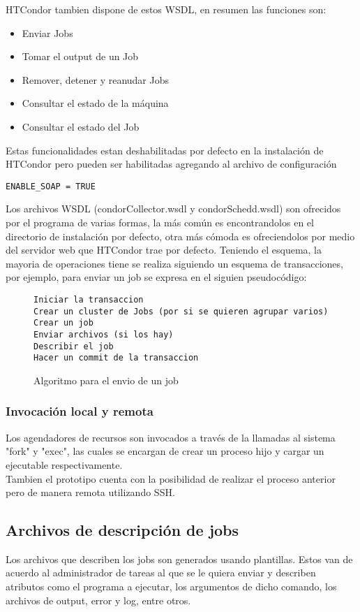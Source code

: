 HTCondor tambien dispone de estos WSDL, en resumen las funciones son: 

\begin{itemize}
\item Enviar Jobs
\item Tomar el output de un Job
\item Remover, detener y reanudar Jobs
\item Consultar el estado de la máquina
\item Consultar el estado del Job
\end{itemize}

Estas funcionalidades estan deshabilitadas por defecto en la instalación de HTCondor pero pueden ser habilitadas agregando al archivo de configuración

\begin{lstlisting}
ENABLE_SOAP = TRUE
\end{lstlisting}

Los archivos WSDL (condorCollector.wsdl y condorSchedd.wsdl) son ofrecidos por el programa de varias formas, la más común es encontrandolos en el directorio de instalación por defecto, otra más cómoda es ofreciendolos por medio del servidor web que HTCondor trae por defecto. Teniendo el esquema, la mayoria de operaciones tiene se realiza siguiendo un esquema de transacciones, por ejemplo, para enviar un job se expresa en el siguien pseudocódigo:

\begin{figure}
\begin{lstlisting}
Iniciar la transaccion
Crear un cluster de Jobs (por si se quieren agrupar varios)
Crear un job
Enviar archivos (si los hay)
Describir el job
Hacer un commit de la transaccion
\end{lstlisting}
\caption{Algoritmo para el envio de un job}
\end{figure}

\subsubsection{Invocación local y remota}
Los agendadores de recursos son invocados a través de la llamadas al sistema "fork" y "exec", las cuales se encargan de crear un proceso hijo y cargar un ejecutable respectivamente. \\

Tambien el prototipo cuenta con la posibilidad de realizar el proceso anterior pero de manera remota utilizando SSH.

\subsection{Archivos de descripción de jobs}
Los archivos que describen los jobs son generados usando plantillas. Estos van de acuerdo al administrador de tareas al que se le quiera enviar y describen atributos como el programa a ejecutar, los argumentos de dicho comando, los archivos de output, error y log, entre otros.

